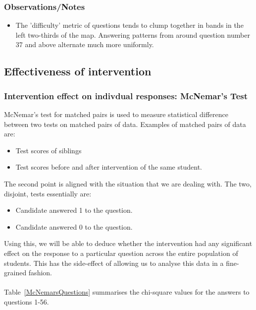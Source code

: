 \documentclass[10pt]{article}
\begin{document}
\subsubsection{Observations/Notes}
\begin{itemize}
\item The 'difficulty' metric of questions tends to clump together in bands in the left two-thirds of the map. Answering patterns from around question number 37 and above alternate much more uniformly.
\end{itemize}

\subsection{Effectiveness of intervention}
\subsubsection{Intervention effect on indivdual responses: McNemar's Test}
McNemar's test for matched pairs is used to measure statistical difference between two tests on matched pairs of data. Examples of matched pairs of data are:
\begin{itemize}
\item Test scores of siblings
\item Test scores before and after intervention of the same student.
\end{itemize}
The second point is aligned with the situation that we are dealing with. The two, disjoint, tests essentially are:
\begin{itemize}
\item Candidate answered 1 to the question.
\item Candidate answered 0 to the question.
\end{itemize}
Using this, we will be able to deduce whether the intervention had any significant effect on the response to a particular question across the entire population of students. This has the side-effect of allowing us to analyse this data in a fine-grained fashion.\\\\
Table~\ref{McNemarsQuestions} summarises the chi-square values for the answers to questions 1-56.
\end{document}
